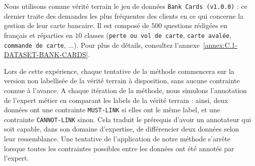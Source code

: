 			Nous utilisons comme vérité terrain le jeu de données \texttt{Bank Cards (v1.0.0)} : ce dernier traite des demandes les plus fréquentes des clients en ce qui concerne la gestion de leur carte bancaire.
			Il est composé de $500$ questions rédigées en français et réparties en $10$ classes (\texttt{perte ou vol de carte}, \texttt{carte avalée}, \texttt{commande de carte}, ...).
			Pour plus de détails, consultez l'annexe~\ref{annex:C.1-DATASET-BANK-CARDS}.
			
			Lors de cette expérience, chaque tentative de la méthode commencera sur la version non labellisée de la vérité terrain à disposition, sans aucune contrainte connue à l'avance.
			A chaque itération de la méthode, nous simulons l'annotation de l'expert métier en comparant les labels de la vérité terrain : ainsi, deux données ont une contrainte \texttt{MUST-LINK} si elles ont le même label, et une contrainte \texttt{CANNOT-LINK} sinon.
			Cela traduit le prérequis d'avoir un annotateur qui soit capable, dans son domaine d'expertise, de différencier deux données selon leur ressemblance.
			Une tentative de l'application de notre méthode s'arrête lorsque toutes les contraintes possibles entre les données ont été annotés par l'expert.

